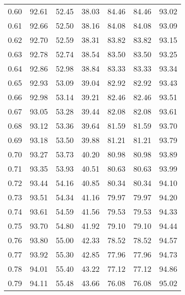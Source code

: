 \begin{tabular}{|c|c|c|c|c|c|c|}
      0.60 &     92.61 &     52.45 &      38.03 &   84.46 &      84.46 &         93.02 \\
      0.61 &     92.66 &     52.50 &      38.16 &   84.08 &      84.08 &         93.09 \\
      0.62 &     92.70 &     52.59 &      38.31 &   83.82 &      83.82 &         93.15 \\
      0.63 &     92.78 &     52.74 &      38.54 &   83.50 &      83.50 &         93.25 \\
      0.64 &     92.86 &     52.98 &      38.84 &   83.33 &      83.33 &         93.34 \\
      0.65 &     92.93 &     53.09 &      39.04 &   82.92 &      82.92 &         93.43 \\
      0.66 &     92.98 &     53.14 &      39.21 &   82.46 &      82.46 &         93.51 \\
      0.67 &     93.05 &     53.28 &      39.44 &   82.08 &      82.08 &         93.61 \\
      0.68 &     93.12 &     53.36 &      39.64 &   81.59 &      81.59 &         93.70 \\
      0.69 &     93.18 &     53.50 &      39.88 &   81.21 &      81.21 &         93.79 \\
      0.70 &     93.27 &     53.73 &      40.20 &   80.98 &      80.98 &         93.89 \\
      0.71 &     93.35 &     53.93 &      40.51 &   80.63 &      80.63 &         93.99 \\
      0.72 &     93.44 &     54.16 &      40.85 &   80.34 &      80.34 &         94.10 \\
      0.73 &     93.51 &     54.34 &      41.16 &   79.97 &      79.97 &         94.20 \\
      0.74 &     93.61 &     54.59 &      41.56 &   79.53 &      79.53 &         94.33 \\
      0.75 &     93.70 &     54.80 &      41.92 &   79.10 &      79.10 &         94.44 \\
      0.76 &     93.80 &     55.00 &      42.33 &   78.52 &      78.52 &         94.57 \\
      0.77 &     93.92 &     55.30 &      42.85 &   77.96 &      77.96 &         94.73 \\
      0.78 &     94.01 &     55.40 &      43.22 &   77.12 &      77.12 &         94.86 \\
      0.79 &     94.11 &     55.48 &      43.66 &   76.08 &      76.08 &         95.02 \\

\end{tabular}
